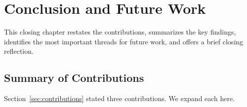 
\chapter{Conclusion and Future Work}\label{chap:conclusion}

This closing chapter restates the contributions, summarizes the key findings, identifies the most important threads for future work, and offers a brief closing reflection.

\section{Summary of Contributions}\label{sec:summary-of-contributions}

Section~\ref{sec:contributions} stated three contributions. We expand each here.

